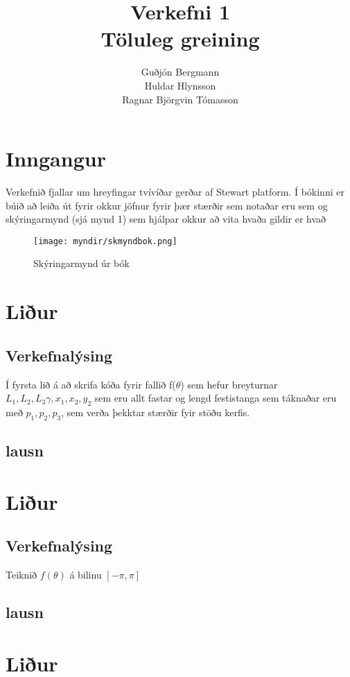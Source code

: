 \documentclass[11pt]{article}   %
\title{Verkefni 1\\Töluleg greining}
\author{Guðjón Bergmann\\Huldar Hlynsson\\Ragnar Björgvin Tómasson}
\numberwithin{equation}{section} %
\begin{document}
\begin{titlepage}
\maketitle
\thispagestyle{empty}
\end{titlepage}

\tableofcontents
\newpage

\section*{Inngangur}
Verkefnið fjallar um hreyfingar tvívíðar gerðar af Stewart platform. Í bókinni er búið að leiða út fyrir okkur jöfnur fyrir þær stærðir sem notaðar eru sem og skýringarmynd (sjá mynd 1) sem hjálpar okkur að vita hvaða gildir er hvað
\begin{figure}[ht!]
\texttt{[image: myndir/skmyndbok.png]}
\centering
\caption{Skýringarmynd úr bók}
\label{skmynd}
\end{figure}


\section{Liður}%
\subsection{Verkefnalýsing}
Í fyrsta lið á að skrifa kóða fyrir fallið f($\theta$) sem hefur breyturnar $L_1,L_2,L_3\gamma,x_1,x_2,y_2$ sem eru allt fastar og lengd festistanga sem táknaðar eru með $p_1,p_2,p_3$, sem verða þekktar stærðir fyir stöðu kerfis.

\subsection{lausn}


\section{Liður}%
\subsection{Verkefnalýsing}
Teiknið $f(\theta)$ á bilinu $[-\pi , \pi]$
\subsection{lausn}


\section{Liður}%
\end{document}
